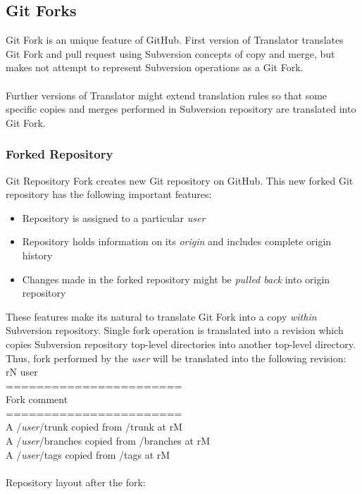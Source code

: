 \subsection{Git Forks}
Git Fork is an unique feature of GitHub. First version of Translator translates Git Fork and pull request using Subversion concepts of copy and merge,
but makes not attempt to represent Subversion operations as a Git Fork.\\\\
Further versions of Translator might extend translation
rules so that some specific copies and merges performed in Subversion repository are translated into Git Fork.

\subsubsection{Forked Repository}
Git Repository Fork creates new Git repository on GitHub. This new forked Git repository has the following 
important features:
\begin{itemize}
\item Repository is assigned to a particular \emph{user}
\item Repository holds information on its \emph{origin} and includes complete origin history
\item Changes made in the forked repository might be \emph{pulled back} into origin repository
\end{itemize}

These features make its natural to translate Git Fork into a copy \emph{within} Subversion repository. Single fork 
operation is translated into a revision which copies Subversion repository top-level directories into another top-level directory. 
Thus, fork performed by the \emph{user} will be translated into the following revision:\\

rN user\\ 
=======================\\
Fork comment             \\
=======================\\
A /\emph{user}/trunk copied from /trunk at rM\\
A /\emph{user}/branches copied from /branches at rM\\
A /\emph{user}/tags copied from /tags at rM\\\\

Repository layout after the fork:\\


